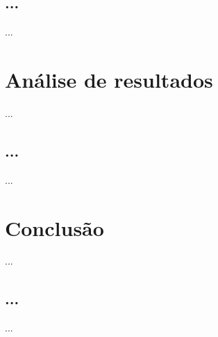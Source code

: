 \documentclass[a4paper]{article}
\begin{document}
\cleardoublepage

\subsection{...}
\indent \indent ...

\cleardoublepage
\section{Análise de resultados}
\indent \indent ...

\cleardoublepage

\subsection{...}
\indent \indent ...

\cleardoublepage
\section{Conclusão}
\indent \indent ...

\cleardoublepage

\subsection{...}
\indent \indent ...
\end{document}
